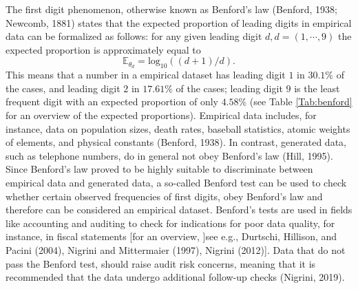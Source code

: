 \documentclass[
  english,
  man,floatsintext]{apa6}
\begin{document}
The first digit phenomenon, otherwise known as Benford's law (Benford, 1938; Newcomb, 1881) states that the expected proportion of leading digits in empirical data can be formalized as follows: for any given leading digit \(d, d = (1, \cdots, 9)\) the expected proportion is approximately equal to \[\mathbb{E}_{\theta_d}= \text{log}_{10}((d + 1)/d).\] This means that a number in a empirical dataset has leading digit \(1\) in \(30.1 \%\) of the cases, and leading digit \(2\) in \(17.61 \%\) of the cases; leading digit \(9\) is the least frequent digit with an expected proportion of only \(4.58 \%\) (see Table \ref{Tab:benford} for an overview of the expected proportions). Empirical data includes, for instance, data on population sizes, death rates, baseball statistics, atomic weights of elements, and physical constants (Benford, 1938). In contrast, generated data, such as telephone numbers, do in general not obey Benford's law (Hill, 1995). Since Benford's law proved to be highly suitable to discriminate between empirical data and generated data, a so-called Benford test can be used to check whether certain observed frequencies of first digits, obey Benford's law and therefore can be considered an empirical dataset. Benford's tests are used in fields like accounting and auditing to check for indications for poor data quality, for instance, in fiscal statements {[}for an overview, {]}see e.g., Durtschi, Hillison, and Pacini (2004), Nigrini and Mittermaier (1997), Nigrini (2012){]}. Data that do not pass the Benford test, should raise audit risk concerns, meaning that it is recommended that the data undergo additional follow-up checks (Nigrini, 2019).
\end{document}
